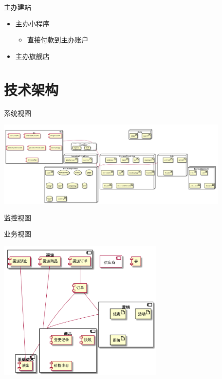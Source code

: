 \documentclass[presentation, bigger]{beamer}
\begin{document}
\begin{frame}[label={sec:org59f25f0}]{主办建站}
\begin{itemize}
\item 主办小程序
\begin{itemize}
\item 直接付款到主办账户
\end{itemize}
\item 主办旗舰店
\end{itemize}
\end{frame}


\section{技术架构}
\label{sec:org6062b40}
\begin{frame}[label={sec:orgb0ed39a}]{系统视图}
\begin{center}
\includegraphics[width=330pt]{tech-structure.png}
\end{center}
\end{frame}


\begin{frame}[label={sec:orgc78f95a}]{监控视图}
\end{frame}

\begin{frame}[label={sec:org6998080}]{业务视图}
\begin{center}
\includegraphics[height=200pt]{tech-biz-structure.png}
\end{center}
\end{frame}
\end{document}
